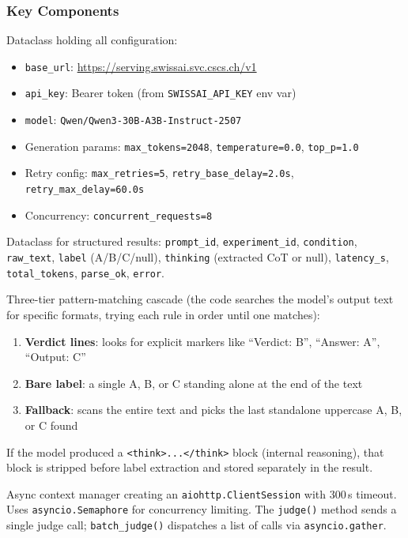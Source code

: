 \documentclass[11pt,a4paper]{article}
\begin{document}
\subsubsection*{Key Components}

\begin{description}[style=nextline, leftmargin=1.5cm]
  \item[\texttt{InferenceConfig}]
    Dataclass holding all configuration:
    \begin{itemize}[nosep]
      \item \texttt{base\_url}: \url{https://serving.swissai.svc.cscs.ch/v1}
      \item \texttt{api\_key}: Bearer token (from \texttt{SWISSAI\_API\_KEY} env var)
      \item \texttt{model}: \texttt{Qwen/Qwen3-30B-A3B-Instruct-2507}
      \item Generation params: \texttt{max\_tokens=2048}, \texttt{temperature=0.0}, \texttt{top\_p=1.0}
      \item Retry config: \texttt{max\_retries=5}, \texttt{retry\_base\_delay=2.0s}, \texttt{retry\_max\_delay=60.0s}
      \item Concurrency: \texttt{concurrent\_requests=8}
    \end{itemize}

  \item[\texttt{JudgeResponse}]
    Dataclass for structured results:
    \texttt{prompt\_id}, \texttt{experiment\_id}, \texttt{condition},
    \texttt{raw\_text}, \texttt{label} (A/B/C/null), \texttt{thinking}
    (extracted CoT or null), \texttt{latency\_s}, \texttt{total\_tokens},
    \texttt{parse\_ok}, \texttt{error}.

  \item[Label Extraction]
    Three-tier pattern-matching cascade (the code searches the model's output
    text for specific formats, trying each rule in order until one matches):
    \begin{enumerate}[nosep]
      \item \textbf{Verdict lines}: looks for explicit markers like
            ``Verdict: B'', ``Answer: A'', ``Output: C''
      \item \textbf{Bare label}: a single A, B, or C standing alone at the
            end of the text
      \item \textbf{Fallback}: scans the entire text and picks the last
            standalone uppercase A, B, or C found
    \end{enumerate}
    If the model produced a \texttt{<think>...</think>} block (internal
    reasoning), that block is stripped before label extraction and stored
    separately in the result.

  \item[\texttt{SwissAIClient}]
    Async context manager creating an \texttt{aiohttp.ClientSession} with
    300\,s timeout. Uses \texttt{asyncio.Semaphore} for concurrency limiting.
    The \texttt{judge()} method sends a single judge call; \texttt{batch\_judge()}
    dispatches a list of calls via \texttt{asyncio.gather}.
\end{description}
\end{document}
